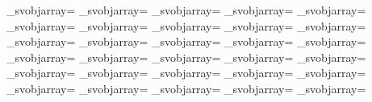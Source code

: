 {{{            \fontdimen\indexb\_svobjarray=\onesp
            \advance\indexb\cntDeltaCB
            \fontdimen\indexb\_svobjarray=\onesp
            \advance\indexb\cntDeltaCC
            \fontdimen\indexb\_svobjarray=\onesp
            \advance\indexb\cntDeltaCD
            \fontdimen\indexb\_svobjarray=\onesp
            \advance\indexb\cntDeltaCE
            \fontdimen\indexb\_svobjarray=\onesp
            \advance\indexb\cntDeltaCF
            \fontdimen\indexb\_svobjarray=\onesp
            \advance\indexb\cntDeltaCG
            \fontdimen\indexb\_svobjarray=\onesp
            \advance\indexb\cntDeltaCH
            \fontdimen\indexb\_svobjarray=\onesp
            \advance\indexb\cntDeltaDA
            \fontdimen\indexb\_svobjarray=\onesp
            \advance\indexb\cntDeltaDB
            \fontdimen\indexb\_svobjarray=\onesp
            \advance\indexb\cntDeltaDC
            \fontdimen\indexb\_svobjarray=\onesp
            \advance\indexb\cntDeltaDD
            \fontdimen\indexb\_svobjarray=\onesp
            \advance\indexb\cntDeltaDE
            \fontdimen\indexb\_svobjarray=\onesp
            \advance\indexb\cntDeltaDF
            \fontdimen\indexb\_svobjarray=\onesp
            \advance\indexb\cntDeltaDG
            \fontdimen\indexb\_svobjarray=\onesp
            \advance\indexb\cntDeltaDH
            \fontdimen\indexb\_svobjarray=\onesp
            \advance\indexb\cntDeltaEA
            \fontdimen\indexb\_svobjarray=\onesp
            \advance\indexb\cntDeltaEB
            \fontdimen\indexb\_svobjarray=\onesp
            \advance\indexb\cntDeltaEC
            \fontdimen\indexb\_svobjarray=\onesp
            \advance\indexb\cntDeltaED
            \fontdimen\indexb\_svobjarray=\onesp
            \advance\indexb\cntDeltaEE
            \fontdimen\indexb\_svobjarray=\onesp
            \advance\indexb\cntDeltaEF
            \fontdimen\indexb\_svobjarray=\onesp
            \advance\indexb\cntDeltaEG
            \fontdimen\indexb\_svobjarray=\onesp
            \advance\indexb\cntDeltaEH
            \fontdimen\indexb\_svobjarray=\onesp
            \advance\indexb\cntDeltaFA
            \fontdimen\indexb\_svobjarray=\onesp
            \advance\indexb\cntDeltaFB
            \fontdimen\indexb\_svobjarray=\onesp
            \advance\indexb\cntDeltaFC
            \fontdimen\indexb\_svobjarray=\onesp
            \advance\indexb\cntDeltaFD
            \fontdimen\indexb\_svobjarray=\onesp
            \advance\indexb\cntDeltaFE
            \fontdimen\indexb\_svobjarray=\onesp
            \advance\indexb\cntDeltaFF
            \fontdimen\indexb\_svobjarray=\onesp
}}}

